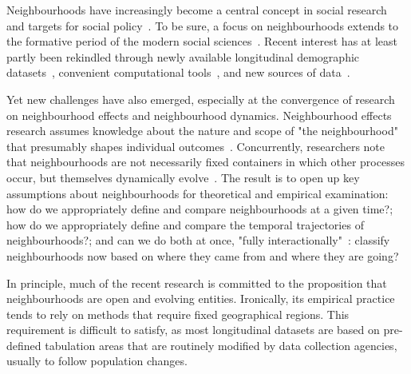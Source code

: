 
Neighbourhoods have increasingly become a central concept in social research and
targets for social
policy~\citep{sampson2012great,galster2019making,stone2015urban,looker2015nation}.
To be sure, a focus on neighbourhoods extends to the formative period of the
modern social sciences~\citep{Abbott1997}. Recent interest has at least partly
been rekindled through newly available longitudinal demographic
datasets~\citep{Logan2014,nhgis}, convenient computational
tools~\citep{rey2018spatio}, and new sources of data~\citep{Poorthuis2018}.


 Yet new challenges have also emerged,
especially at the convergence of research on neighbourhood effects and
neighbourhood dynamics. Neighbourhood effects research assumes knowledge about
the nature and scope of "the neighbourhood" that presumably shapes individual
outcomes~\citep{Kwan2018,Shelton2019}. Concurrently, researchers note that
neighbourhoods are not necessarily fixed containers in which other processes
occur, but themselves dynamically
evolve~\citep{Delmelle2017,Reades2019,li2018new}. The result is to open up key
assumptions about neighbourhoods for theoretical and empirical examination: how
do we appropriately define and compare neighbourhoods at a given time?; how do
we appropriately define and compare the temporal trajectories of
neighbourhoods?; and can we do both at once, "fully
interactionally"~\citep{Abbott1997}: classify neighbourhoods now based on where
they came from and where they are going?


In principle, much of the recent research is committed to the proposition that
neighbourhoods are open and evolving entities. Ironically, its empirical
practice tends to rely on methods that require fixed geographical regions. This
requirement is difficult to satisfy, as most longitudinal datasets are based on
pre-defined tabulation areas that are routinely modified by data collection
agencies, usually to follow population changes. 

